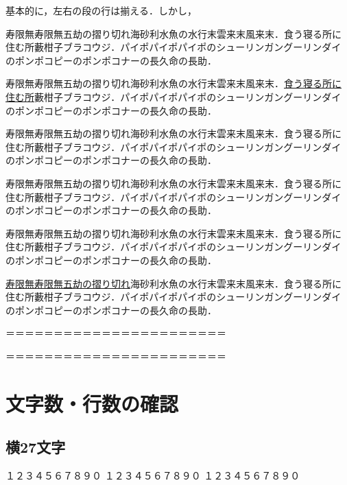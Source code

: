 \documentclass[a4j, 12Q, twocolumn, twoside, draft]{jsarticle}
\begin{document}
基本的に，左右の段の行は揃える．しかし，



寿限無寿限無五劫の摺り切れ海砂利水魚の水行末雲来末風来末．食う寝る所に
住む所藪柑子ブラコウジ．パイポパイポパイポのシューリンガングーリンダイ
のポンポコピーのポンポコナーの長久命の長助．

寿限無寿限無五劫の摺り切れ海砂利水魚の水行末雲来末風来末．\underline{食う寝る所に
住む所}藪柑子ブラコウジ．パイポパイポパイポのシューリンガングーリンダイ
のポンポコピーのポンポコナーの長久命の長助．

寿限無寿限無五劫の摺り切れ海砂利水魚の水行末雲来末風来末．食う寝る所に
住む所藪柑子ブラコウジ．パイポパイポパイポのシューリンガングーリンダイ
のポンポコピーのポンポコナーの長久命の長助．

寿限無寿限無五劫の摺り切れ海砂利水魚の水行末雲来末風来末．食う寝る所に
住む所藪柑子ブラコウジ．パイポパイポパイポのシューリンガングーリンダイ
のポンポコピーのポンポコナーの長久命の長助．

寿限無寿限無五劫の摺り切れ海砂利水魚の水行末雲来末風来末．食う寝る所に
住む所藪柑子ブラコウジ．パイポパイポパイポのシューリンガングーリンダイ
のポンポコピーのポンポコナーの長久命の長助．

\underline{寿限無寿限無五劫の摺り切れ}海砂利水魚の水行末雲来末風来末．食う寝る所に
住む所藪柑子ブラコウジ．パイポパイポパイポのシューリンガングーリンダイ
のポンポコピーのポンポコナーの長久命の長助．

＝＝＝＝＝＝＝＝＝＝＝＝＝＝＝＝＝＝＝＝＝＝＝


＝＝＝＝＝＝＝＝＝＝＝＝＝＝＝＝＝＝＝＝＝＝＝



\section{文字数・行数の確認}
\subsection{横27文字}
\noindent
１２３４５６７８９０
１２３４５６７８９０
１２３４５６７８９０
\end{document}
